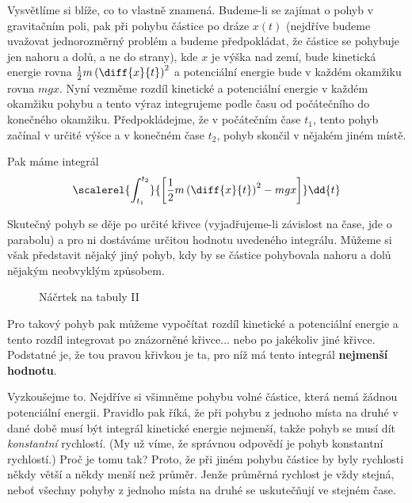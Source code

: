     Vysvětlíme si blíže, co to vlastně znamená. Budeme-li se zajímat o pohyb v gravitačním poli, pak
    při pohybu částice po dráze \(x(t)\) (nejdříve budeme uvažovat jednorozměrný problém a budeme
    předpokládat, že částice se pohybuje jen nahoru a dolů, a ne do strany), kde \(x\) je výška nad
    zemí, bude kinetická energie rovna \(\frac{1}{2}m\left(\diff{x}{t}\right)^2\) a potenciální
    energie bude v každém okamžiku rovna \(mgx\). Nyní vezměme rozdíl kinetické a potenciální
    energie v každém okamžiku pohybu a tento výraz integrujeme podle času od počátečního do
    konečného okamžiku. Předpokládejme, že v počátečním čase \(t_1\), tento pohyb začínal v určité
    výšce a v konečném čase \(t_2\), pohyb skončil v nějakém jiném místě. 

    Pak máme integrál
    \begin{equation*}
      \scalerel{\int_{t_1}^{t_2}}{\left[\frac{1}{2}m\left(\diff{x}{t}\right)^2 - mgx\right]}\dd{t}
    \end{equation*}

    Skutečný pohyb se děje po určité křivce (vyjadřujeme-li závislost na čase, jde o parabolu) a pro
    ni dostáváme určitou hodnotu uvedeného integrálu. Můžeme si však představit nějaký jiný pohyb,
    kdy by se částice pohybovala nahoru a dolů nějakým neobvyklým způsobem.

    \begin{figure}[ht!]
      \centering
        \hfill
      \caption{Náčrtek na tabuly II}
      \label{fyz:fig653}
    \end{figure}
    
    Pro takový pohyb pak můžeme vypočítat rozdíl kinetické a potenciální energie a tento rozdíl
    integrovat po znázorněné křivce... nebo po jakékoliv jiné křivce. Podstatné je, že tou pravou
    křivkou je ta, pro níž má tento integrál \textbf{nejmenší hodnotu}.

    Vyzkoušejme to. Nejdříve si všimněme pohybu volné částice, která nemá žádnou potenciální
    energii. Pravidlo pak říká, že při pohybu z jednoho místa na druhé v dané době musí být integrál
    kinetické energie nejmenší, takže pohyb se musí dít \emph{konstantní} rychlostí. (My už víme, že
    správnou odpovědí je pohyb konstantní rychlostí.) Proč je tomu tak? Proto, že při jiném pohybu
    částice by byly rychlosti někdy větší a někdy menší než průměr. Jenže průměrná rychlost je vždy
    stejná, neboť všechny pohyby z jednoho místa na druhé se uskutečňují ve stejném čase.


